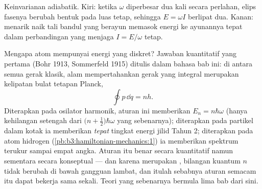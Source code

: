 \begin{omfigure}

{\small Keinvarianan adiabatik. Kiri: ketika $\omega$ diperbesar dua
kali secara perlahan, elips fasenya berubah bentuk pada luas tetap,
sehingga $E = \omega I$ berlipat dua. Kanan: menarik naik tali bandul
yang berayun memasok energi ke ayunannya tepat dalam perbandingan yang
menjaga $I = E/\omega$ tetap.}
\end{omfigure}

\begin{remark}\label{rem:b3:hamiltonian-mechanics:old-quantum}
Mengapa atom mempunyai energi yang diskret? Jawaban kuantitatif yang
pertama (Bohr 1913, Sommerfeld 1915) ditulis dalam bahasa bab ini: di
antara semua gerak klasik, alam mempertahankan gerak yang integral
 merupakan kelipatan bulat tetapan Planck,
\[
\oint p\,\dd q = nh .
\]
Diterapkan pada osilator harmonik, aturan ini memberikan $E_n = n\hbar\omega$
(hanya kehilangan setengah dari $\big(n + \tfrac12\big)\hbar
\omega$ yang sebenarnya); diterapkan pada partikel dalam kotak ia
memberikan \emph{tepat} tingkat energi jilid Tahun 2; diterapkan pada
atom hidrogen (\cref{pb:b3:hamiltonian-mechanics:1}) ia memberikan
spektrum terukur sampai empat angka. Aturan itu benar secara kuantitatif
namun sementara secara konseptual --- dan karena  merupakan , bilangan kuantum $n$ tidak berubah di bawah gangguan lambat,
dan itulah sebabnya aturan semacam itu dapat bekerja sama sekali. Teori
yang sebenarnya bermula lima bab dari sini.
\end{remark}

